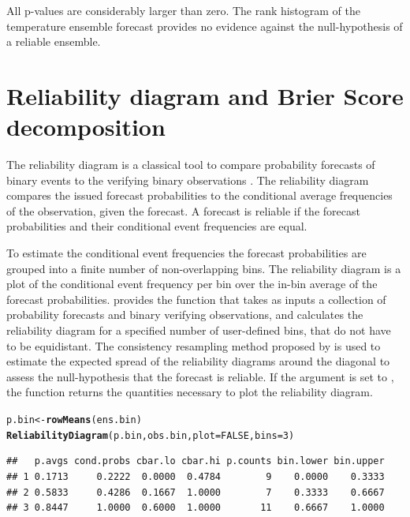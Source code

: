 \documentclass[article]{jss}\usepackage{graphicx, color}
\makeatletter
\newcommand{\hlfunctioncall}[1]{\textcolor[rgb]{0,0.501960784313725,0.752941176470588}{\textbf{#1}}}%
\newenvironment{kframe}{%
 \def\at@end@of@kframe{}%
 \ifinner\ifhmode%
  \def\at@end@of@kframe{\end{minipage}}%
  \begin{minipage}{\columnwidth}%
 \fi\fi%
 \def\FrameCommand##1{\hskip\@totalleftmargin \hskip-\fboxsep
 \colorbox{shadecolor}{##1}\hskip-\fboxsep
     \hskip-\linewidth \hskip-\@totalleftmargin \hskip\columnwidth}%
 \MakeFramed {\advance\hsize-\width
   \@totalleftmargin\z@ \linewidth\hsize
   \@setminipage}}%
 {\par\unskip\endMakeFramed%
 \at@end@of@kframe}
\newenvironment{knitrout}{}{} %
\makeatother
\begin{document}
All p-values are considerably larger than zero.
The rank histogram of the temperature ensemble forecast provides no evidence against the null-hypothesis of a reliable ensemble.

\section{Reliability diagram and Brier Score decomposition}

The reliability diagram is a classical tool to compare probability forecasts of binary events to the verifying binary observations \citep{wilks2011statistical,jolliffe2012forecast}.
The reliability diagram compares the issued forecast probabilities to the conditional average frequencies of the observation, given the forecast.
A forecast is reliable if the forecast probabilities and their conditional event frequencies are equal.


To estimate the conditional event frequencies the forecast probabilities are grouped into a finite number of non-overlapping bins.
The reliability diagram is a plot of the conditional event frequency per bin over the in-bin average of the forecast probabilities.
 provides the function  that takes as inputs a collection of probability forecasts and binary verifying observations, and calculates the reliability diagram for a specified number of user-defined bins,  that do not have to be equidistant.
The consistency resampling method proposed by \citet{broecker2007increasing} is used to estimate the expected spread of the reliability diagrams around the diagonal to assess the null-hypothesis that the forecast is reliable.
If the  argument is set to , the  function returns the quantities necessary to plot the reliability diagram.
%
\begin{knitrout}
\color{fgcolor}\begin{kframe}
\begin{alltt}
p.bin <- \hlfunctioncall{rowMeans}(ens.bin)
\hlfunctioncall{ReliabilityDiagram}(p.bin, obs.bin, plot=FALSE, bins=3)
\end{alltt}
\begin{verbatim}
##   p.avgs cond.probs cbar.lo cbar.hi p.counts bin.lower bin.upper
## 1 0.1713     0.2222  0.0000  0.4784        9    0.0000    0.3333
## 2 0.5833     0.4286  0.1667  1.0000        7    0.3333    0.6667
## 3 0.8447     1.0000  0.6000  1.0000       11    0.6667    1.0000
\end{verbatim}
\end{kframe}
\end{knitrout}
\end{document}
